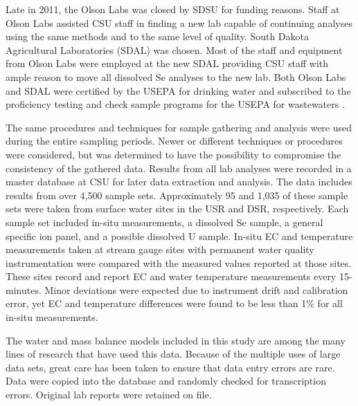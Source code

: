 \begin{linenumbers}
Late in 2011, the Olson Labs was closed by SDSU for funding reasons.  Staff at Olson Labs assisted CSU staff in finding a new lab capable of continuing analyses using the same methods and to the same level of quality.  South Dakota Agricultural Laboratories (SDAL) was chosen.  Most of the staff and equipment from Olson Labs were employed at the new SDAL providing CSU staff with ample reason to move all dissolved Se analyses to the new lab.  Both Olson Labs and SDAL were certified by the USEPA for drinking water and subscribed to the proficiency testing and check sample programs for the USEPA for wastewaters .

The same procedures and techniques for sample gathering and analysis were used during the entire sampling periods.  Newer or different techniques or procedures were considered, but was determined to have the possibility to compromise the consistency of the gathered data.  Results from all lab analyses were recorded in a master database at CSU for later data extraction and analysis.  The data includes results from over 4,500 sample sets.  Approximately 95 and 1,035 of these sample sets were taken from surface water sites in the USR and DSR, respectively.  Each sample set included in-situ measurements, a dissolved Se sample, a general specific ion panel, and a possible dissolved U sample.  In-situ EC and temperature measurements taken at stream gauge sites with permanent water quality instrumentation were compared with the measured values reported at those sites.  These sites record and report EC and water temperature measurements every 15-minutes.  Minor deviations were expected due to instrument drift and calibration error, yet EC and temperature differences were found to be less than 1\% for all in-situ measurements.

The water and mass balance models included in this study are among the many lines of research that have used this data.  Because of the multiple uses of large data sets, great care has been taken to ensure that data entry errors are rare.  Data were copied into the database and randomly checked for transcription errors.  Original lab reports were retained on file.

\clearpage{}

\end{linenumbers}
